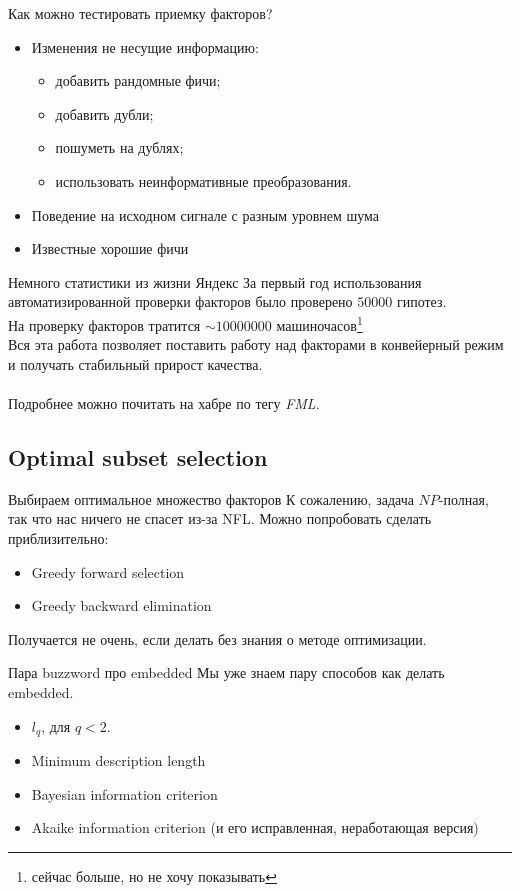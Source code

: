 \documentclass[14pt, fleqn, xcolor={dvipsnames, table}]{beamer}
\begin{document}
\begin{frame}{Как можно тестировать приемку факторов?}
\begin{itemize}
  \item Изменения не несущие информацию:
  \begin{itemize}
    \item добавить рандомные фичи;
    \item добавить дубли;
    \item пошуметь на дублях;
    \item использовать неинформативные преобразования.
  \end{itemize}
  \item Поведение на исходном сигнале с разным уровнем шума
  \item Известные хорошие фичи
\end{itemize}
\end{frame}

\begin{frame}{Немного статистики из жизни {\color{red}Я}ндекс}
За первый год использования автоматизированной проверки факторов было проверено \textbf{$50 000$} гипотез. \\
На проверку факторов тратится \textbf{$\sim10 000 000$} машиночасов\footnote{сейчас больше, но не хочу показывать} \\
Вся эта работа позволяет поставить работу над факторами в конвейерный режим и получать стабильный прирост качества. \\
~\\
Подробнее можно почитать на хабре по тегу \textit{FML}.
\end{frame}

\subsection{Optimal subset selection}
\begin{frame}{Выбираем оптимальное множество факторов}
К сожалению, задача $NP$-полная, так что нас ничего не спасет из-за NFL. Можно попробовать сделать приблизительно:
\begin{itemize}
  \item Greedy forward selection
  \item Greedy backward elimination
\end{itemize}
Получается не очень, если делать без знания о методе оптимизации.
\end{frame}

\begin{frame}{Пара buzzword про embedded}
Мы уже знаем пару способов как делать embedded.
\begin{itemize}
  \item $l_q$, для $q < 2$.
  \item Minimum description length
  \item Bayesian information criterion
  \item Akaike information criterion (и его исправленная, неработающая версия)
\end{itemize}
\end{frame}
\end{document}
